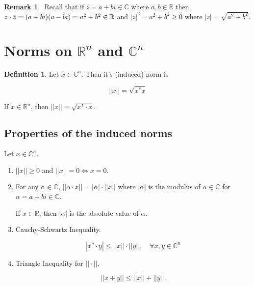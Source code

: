 \documentclass[12pt]{article}
\newcommand{\overbar}[1]{\mkern 1.5mu\overline{\mkern-1.5mu#1\mkern-1.5mu}\mkern 1.5mu}
\theoremstyle{definition}
\newtheorem*{definition}{Definition}
\newtheorem*{remark}{Remark}
\begin{document}
\begin{remark} $ $
Recall that if $z = a + bi \in \mathbb{C}$ where $a, b \in \mathbb{R}$ then
$z \cdot \overbar{z} = (a + bi) (a - bi) = a^2 + b^2 \in \mathbb{R}$ and
$|z|^2 = a^2 + b^2 \geq 0$ where $|z| = \sqrt{a^2 + b^2}$.
\end{remark}

\section{Norms on $\mathbb{R}^n$ and $\mathbb{C}^n$}

\begin{definition}
Let $x \in \mathbb{C}^n$. Then it's (induced) norm is

\[ ||x|| = \sqrt{x^* x} \]

If $x \in \mathbb{R}^n$, then $||x|| = \sqrt{x^T \cdot x}$.
\end{definition}

\subsection{Properties of the induced norms}

Let $x \in \mathbb{C}^n$.

\begin{enumerate}[label = (\arabic*)]
\item $||x|| \geq 0$ and $||x|| = 0 \iff x = 0$.
\item For any $\alpha \in \mathbb{C}$, $||\alpha \cdot x|| = |\alpha| \cdot ||x||$
where $|\alpha|$ is the modulus of $\alpha \in \mathbb{C}$ for 
$\alpha = a + bi \in \mathbb{C}$.

If $x \in \mathbb{R}$, then $|\alpha|$ is the absolute value of $\alpha$.

\item Cauchy-Schwartz Inequality.

\[ |x^* \cdot y| \leq ||x|| \cdot ||y||, \quad \forall x, y \in \mathbb{C}^n \]

\item Triangle Inequality for $|| \cdot ||$.

\[||x + y || \leq ||x|| + ||y||.\]

\end{enumerate}
\end{document}
